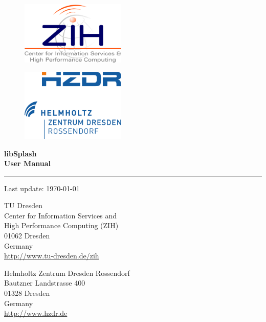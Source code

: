 \documentclass[a4paper,10pt,BCOR12mm]{report}
\begin{document}
\thispagestyle{empty}

\begin{figure}[ht]
\begin{minipage}[b]{0.45\linewidth}
	\centering
	\noindent\includegraphics[width=5cm]{zih_logo}\\
\end{minipage}
\hspace{0.05\linewidth}
\begin{minipage}[b]{0.45\linewidth}
	\centering
	\noindent\includegraphics[width=5cm]{hzdr_logo}\\
\end{minipage}
\end{figure}

\vspace{1cm}

{\bfseries\Huge
\noindent
libSplash \\[.5cm]
User Manual\\
\rule{0pt}{0.75cm}\rule{\textwidth}{1pt}
}

{\centering
Last update: \today
}

\vspace{1cm}

{\noindent}TU Dresden\\
Center for Information Services and \\High Performance Computing (ZIH)\\
01062 Dresden\\
Germany\\[1ex]
\url{http://www.tu-dresden.de/zih}\\

\vspace{1cm}

{\noindent}Helmholtz Zentrum Dresden Rossendorf\\
Bautzner Landstrasse 400\\
01328 Dresden\\
Germany\\[1ex]
\url{http://www.hzdr.de}\\
\end{document}
